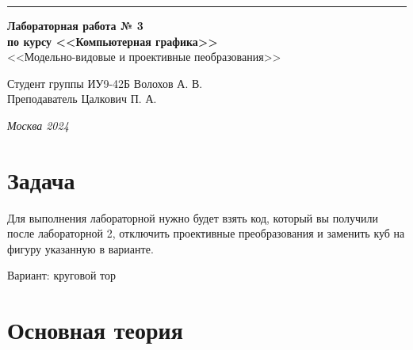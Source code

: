 \documentclass[a4paper, 14pt]{extarticle}
\begin{document}
\begin{titlepage}
\vspace*{-16pt}
\hspace{30pt}\rule{0.866\textwidth}{0.4pt}
  
\vspace{11em}

\begin{center}
\Large {\bf Лабораторная работа № 3} \\
\large {\bf по курсу <<Компьютерная графика>>} \\
\large <<Модельно-видовые и проективные пеобразования>>
\end{center}\normalsize

\vspace{8em}


\begin{flushright}
  {Студент группы ИУ9-42Б Волохов А. В.\hspace*{15pt} \\
  \vspace{2ex}
  Преподаватель Цалкович П. А.\hspace*{15pt}}
\end{flushright}

\bigskip

\vfill


\begin{center}
\textsl{Москва 2024}
\end{center}
\end{titlepage}

\renewcommand{\ttdefault}{pcr}

\setlength{\tabcolsep}{3pt}
\newpage
\setcounter{page}{2}

\section{Задача}\label{Sect::task}
\par
Для выполнения лабораторной нужно будет взять код, который вы получили после лабораторной 2, отключить проективные преобразования и заменить куб на фигуру указанную в варианте.
\par
Вариант: круговой тор

\section{Основная теория}
\end{document}
